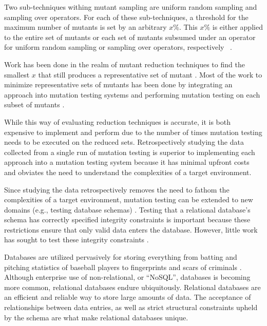 Two sub-techniques withing mutant sampling are uniform random sampling and sampling over operators.
For each of these sub-techniques, a threshold for the maximum number of mutants is set by an arbitrary \(x\%\).
This $x\%$ is either applied to the entire set of mutants or each set of mutants subsumed under an operator for uniform random sampling or
sampling over operators, respectively ~\cite{gopinath2015empirical, gopinath2015mutation}.

Work has been done in the realm of mutant reduction techniques to find the smallest $x$ that still produces
a representative set of mutant \cite{jia2011analysis, mathur1994empirical}. Most of the work
to minimize representative sets of mutants has been done by integrating an approach into
mutation testing systems and performing mutation testing on each subset of mutants \cite{demillo1988extended, king1991fortran}.

While this way of evaluating reduction techniques is accurate, it is both
expensive to implement and perform due to the number of times mutation testing
needs to be executed on the reduced sets. Retrospectively studying the data
collected from a single run of mutation testing is superior to implementing each
approach into a mutation testing system because it has minimal upfront costs and obviates the need
to understand the complexities of a target environment.

Since studying the data retrospectively removes the need to fathom the complexities of a target environment,
mutation testing can be extended to new domains (e.g., testing database schemas) \cite{mcminn2016virtual, mcminn2015effectiveness, wright2013efficient}.
Testing that a relational database's schema has correctly specified integrity constraints is important
because these restrictions ensure that only valid data enters the database. However, little work has
sought to test these integrity constraints \cite{mcminn2016virtual}.

Databases are utilized pervasively for storing everything from batting and pitching statistics of baseball
players \cite{lahmanbaseball} to fingerprints and scars of criminals \cite{ngi}.
Although enterprise use of non-relational, or ``NoSQL'', databases is becoming more common,
relational databases endure ubiquitously.
Relational databases are an efficient and reliable way to store large amounts of data.
The acceptance of relationships between data entries, as well as strict structural constraints
upheld by the schema are what make relational databases unique.

